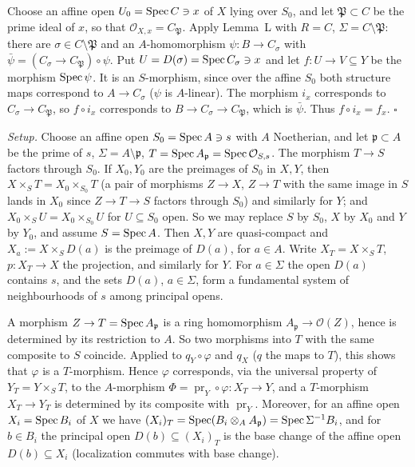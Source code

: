 \documentclass[11pt]{article}
\begin{document}
Choose an affine open $U_0=\operatorname{Spec} C\ni x$ of $X$ lying over $S_0$, and let $\mathfrak P\subset C$ be the prime ideal of $x$, so that $\mathcal O_{X,x}=C_{\mathfrak P}$. Apply Lemma~L with $R=C$, $\Sigma=C\setminus\mathfrak P$: there are $\sigma\in C\setminus\mathfrak P$ and an $A$-homomorphism $\psi:B\to C_\sigma$ with $\bar\psi=(C_\sigma\to C_{\mathfrak P})\circ\psi$. Put $U=D(\sigma)=\operatorname{Spec} C_\sigma\ni x$ and let $f:U\to V\subseteq Y$ be the morphism $\operatorname{Spec}\psi$. It is an $S$-morphism, since over the affine $S_0$ both structure maps correspond to $A\to C_\sigma$ ($\psi$ is $A$-linear). The morphism $i_x$ corresponds to $C_\sigma\to C_{\mathfrak P}$, so $f\circ i_x$ corresponds to $B\to C_\sigma\to C_{\mathfrak P}$, which is $\bar\psi$. Thus $f\circ i_x=f_x$. \hfill$\square$

\pf
\emph{Setup.} Choose an affine open $S_0=\operatorname{Spec} A\ni s$ with $A$ Noetherian, and let $\mathfrak p\subset A$ be the prime of $s$, $\Sigma=A\setminus\mathfrak p$, $T=\operatorname{Spec} A_{\mathfrak p}=\operatorname{Spec}\mathcal O_{S,s}$. The morphism $T\to S$ factors through $S_0$. If $X_0,Y_0$ are the preimages of $S_0$ in $X,Y$, then $X\times_ST=X_0\times_{S_0}T$ (a pair of morphisms $Z\to X$, $Z\to T$ with the same image in $S$ lands in $X_0$ since $Z\to T\to S$ factors through $S_0$) and similarly for $Y$; and $X_0\times_S U=X_0\times_{S_0}U$ for $U\subseteq S_0$ open. So we may replace $S$ by $S_0$, $X$ by $X_0$ and $Y$ by $Y_0$, and assume $S=\operatorname{Spec} A$. Then $X,Y$ are quasi-compact and $X_a:=X\times_SD(a)$ is the preimage of $D(a)$, for $a\in A$. Write $X_T=X\times_ST$, $p:X_T\to X$ the projection, and similarly for $Y$. For $a\in\Sigma$ the open $D(a)$ contains $s$, and the sets $D(a)$, $a\in\Sigma$, form a fundamental system of neighbourhoods of $s$ among principal opens.

A morphism $Z\to T=\operatorname{Spec} A_{\mathfrak p}$ is a ring homomorphism $A_{\mathfrak p}\to\mathcal O(Z)$, hence is determined by its restriction to $A$. So two morphisms into $T$ with the same composite to $S$ coincide. Applied to $q_Y\circ\varphi$ and $q_X$ ($q$ the maps to $T$), this shows that $\varphi$ is a $T$-morphism. Hence $\varphi$ corresponds, via the universal property of $Y_T=Y\times_ST$, to the $A$-morphism $\Phi=\operatorname{pr}_Y\circ\varphi:X_T\to Y$, and a $T$-morphism $X_T\to Y_T$ is determined by its composite with $\operatorname{pr}_Y$. Moreover, for an affine open $X_i=\operatorname{Spec} B_i$ of $X$ we have $(X_i)_T=\operatorname{Spec}(B_i\otimes_AA_{\mathfrak p})=\operatorname{Spec}\Sigma^{-1}B_i$, and for $b\in B_i$ the principal open $D(b)\subseteq(X_i)_T$ is the base change of the affine open $D(b)\subseteq X_i$ (localization commutes with base change).
\end{document}
